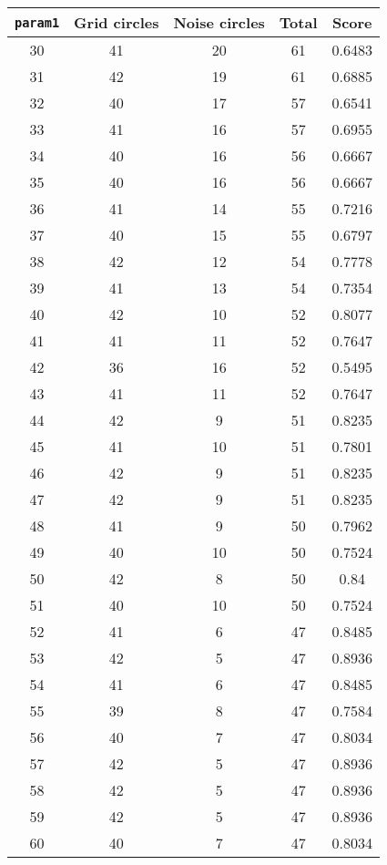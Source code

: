 \documentclass[letterpaper, 12pt]{article}
\begin{document}
\begin{longtable}{|c|c|c|c|c|}
\hline
\textbf{\texttt{param1}} & \textbf{Grid circles} & \textbf{Noise circles} & \textbf{Total} & \textbf{Score} \\
\hline
30 & 41 & 20 & 61 & 0.6483 \\
\hline
31 & 42 & 19 & 61 & 0.6885 \\
\hline
32 & 40 & 17 & 57 & 0.6541 \\
\hline
33 & 41 & 16 & 57 & 0.6955 \\
\hline
34 & 40 & 16 & 56 & 0.6667 \\
\hline
35 & 40 & 16 & 56 & 0.6667 \\
\hline
36 & 41 & 14 & 55 & 0.7216 \\
\hline
37 & 40 & 15 & 55 & 0.6797 \\
\hline
38 & 42 & 12 & 54 & 0.7778 \\
\hline
39 & 41 & 13 & 54 & 0.7354 \\
\hline
40 & 42 & 10 & 52 & 0.8077 \\
\hline
41 & 41 & 11 & 52 & 0.7647 \\
\hline
42 & 36 & 16 & 52 & 0.5495 \\
\hline
43 & 41 & 11 & 52 & 0.7647 \\
\hline
44 & 42 & 9 & 51 & 0.8235 \\
\hline
45 & 41 & 10 & 51 & 0.7801 \\
\hline
46 & 42 & 9 & 51 & 0.8235 \\
\hline
47 & 42 & 9 & 51 & 0.8235 \\
\hline
48 & 41 & 9 & 50 & 0.7962 \\
\hline
49 & 40 & 10 & 50 & 0.7524 \\
\hline
50 & 42 & 8 & 50 & 0.84 \\
\hline
51 & 40 & 10 & 50 & 0.7524 \\
\hline
52 & 41 & 6 & 47 & 0.8485 \\
\hline
53 & 42 & 5 & 47 & 0.8936 \\
\hline
54 & 41 & 6 & 47 & 0.8485 \\
\hline
55 & 39 & 8 & 47 & 0.7584 \\
\hline
56 & 40 & 7 & 47 & 0.8034 \\
\hline
57 & 42 & 5 & 47 & 0.8936 \\
\hline
58 & 42 & 5 & 47 & 0.8936 \\
\hline
59 & 42 & 5 & 47 & 0.8936 \\
\hline
60 & 40 & 7 & 47 & 0.8034 \\

\end{longtable}
\end{document}
